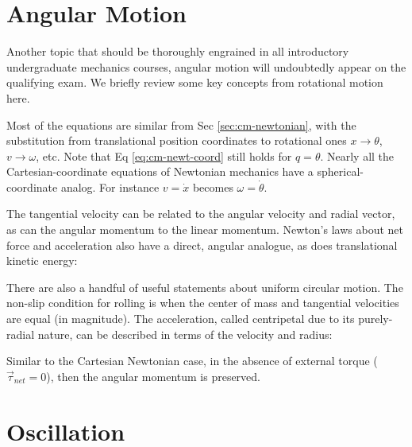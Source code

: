 \section{Angular Motion}
\label{sec:cm-angular}
Another topic that should be thoroughly engrained in all introductory undergraduate mechanics courses, angular motion will undoubtedly appear on the qualifying exam. We briefly review some key concepts from rotational motion here.

Most of the equations are similar from Sec \ref{sec:cm-newtonian}, with the substitution from translational position coordinates to rotational ones $x \rightarrow \theta$, $v\rightarrow \omega$, etc. Note that Eq \ref{eq:cm-newt-coord} still holds for $q=\theta$. Nearly all the Cartesian-coordinate equations of Newtonian mechanics have a spherical-coordinate analog. For instance $v = \dot{x}$ becomes $\omega = \dot{\theta}$.


The tangential velocity can be related to the angular velocity and radial vector, as can the angular momentum to the linear momentum. Newton's laws about net force and acceleration also have a direct, angular analogue, as does translational kinetic energy:




There are also a handful of useful statements about uniform circular motion. The non-slip condition for rolling is when the center of mass and tangential velocities are equal (in magnitude). The acceleration, called centripetal due to its purely-radial nature, can be described in terms of the velocity and radius:




Similar to the Cartesian Newtonian case, in the absence of external torque ($\vec{\tau}_{net}=0$), then the angular momentum is preserved.


\section{Oscillation}
\label{sec:cm-oscillation}

